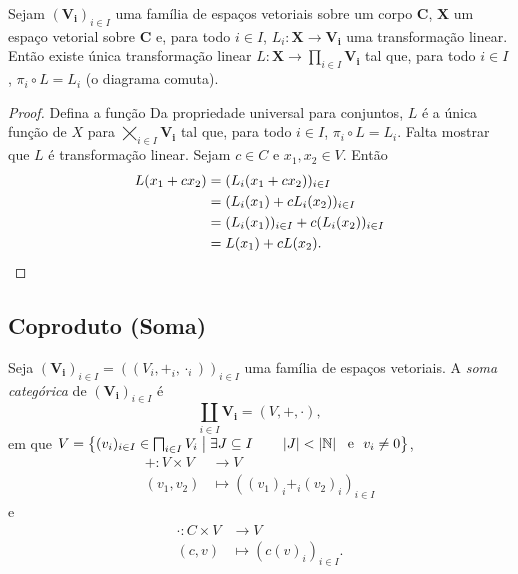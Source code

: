 \begin{prop}
Sejam $(\bm{V_i})_{i \in I}$ uma família de espaços vetoriais sobre um corpo $\bm C$, $\bm X$ um espaço vetorial sobre $\bm C$ e, para todo $i \in I$, $L_i: \bm X \to \bm{V_i}$ uma transformação linear. Então existe única transformação linear $L: \bm X \to \prod_{i \in I} \bm{V_i}$ tal que, para todo $i \in I$, $\pi_i \circ L = L_i$ (o diagrama comuta).
\begin{figure}
\centering
{}
\end{figure}
\end{prop}
\begin{proof}
Defina a função  Da propriedade universal para conjuntos, $L$ é a única função de $X$ para $\bigtimes_{i \in I} \bm{V_i}$ tal que, para todo $i \in I$, $\pi_i \circ L = L_i$. Falta mostrar que $L$ é transformação linear. Sejam $c \in C$ e $x_1,x_2 \in V$. Então
	\begin{align*}
	L(x_1+cx_2) &= (L_i(x_1+cx_2))_{i \in I} \\
		&= (L_i(x_1)+cL_i(x_2))_{i \in I} \\
		&= (L_i(x_1))_{i \in I}+c(L_i(x_2))_{i \in I} \\
		&= L(x_1)+cL(x_2). \qedhere
	\end{align*}
\end{proof}

\subsection{Coproduto (Soma)}

\begin{defi}
Seja $(\bm{V_i})_{i \in I} = ((V_i,+_i,\cdot_i))_{i \in I}$ uma família de espaços vetoriais. A \emph{soma categórica} de $(\bm{V_i})_{i \in I}$ é
	\begin{equation*}
	\coprod_{i \in I} \bm{V_i} = (V,+,\cdot),
	\end{equation*}
em que $V = \set{(v_i)_{i \in I} \in \prod_{i \in I} V_i}{\exists J \subseteq I \qquad \card{J} < \card{\N} \e v_i \neq 0}$,
	\begin{align*}
	+: V \times V &\to V \\
			(v_1,v_2) &\mapsto ((v_1)_i +_i (v_2)_i)_{i \in I}
	\end{align*}
e
	\begin{align*}
	\cdot: C \times V &\to V \\
			(c,v) &\mapsto (c(v)_i)_{i \in I}.
	\end{align*}
\end{defi}


